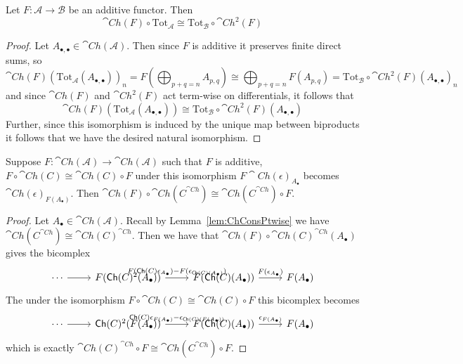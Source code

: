 \begin{lem}[label=lem:totComm]
    Let $F:\mathcal{A}\to \mathcal{B}$ be an additive functor. Then 
    \begin{equation*}
        \cat{Ch}(F)\circ \text{Tot}_\mathcal{A} \cong \text{Tot}_\mathcal{B}\circ \cat{Ch}^2(F)
    \end{equation*}
\end{lem}
\begin{proof}
    Let $A_{\bullet,\bullet} \in \cat{Ch}(\mathcal{A})$. Then since $F$ is additive it preserves finite direct sums, so 
    \begin{equation*}
        \cat{Ch}(F)(\text{Tot}_\mathcal{A}(A_{\bullet,\bullet}))_n = F\left(\bigoplus_{p+q=n}A_{p,q}\right) \cong \bigoplus_{p+q=n}F(A_{p,q}) = \text{Tot}_\mathcal{B}\circ \cat{Ch}^2(F)(A_{\bullet,\bullet})_n
    \end{equation*}
    and since $\cat{Ch}(F)$ and $\cat{Ch}^2(F)$ act term-wise on differentials, it follows that
    \begin{equation*}
        \cat{Ch}(F)(\text{Tot}_\mathcal{A}(A_{\bullet,\bullet})) \cong \text{Tot}_\mathcal{B}\circ \cat{Ch}^2(F)(A_{\bullet,\bullet})
    \end{equation*}
    Further, since this isomorphism is induced by the unique map between biproducts it follows that we have the desired natural isomorphism.
\end{proof}

\begin{lem}[label=commWithComonad]
	Suppose $F:\cat{Ch}(\mathcal{A})\to \cat{Ch}(\mathcal{A})$ such that $F$ is additive, $F\circ \cat{Ch}(C)\cong \cat{Ch}(C)\circ F$ under this isomorphism $F\cat{Ch}(\epsilon)_{A_\bullet}$ becomes $\cat{Ch}(\epsilon)_{F(A_\bullet)}$. Then $\cat{Ch}(F)\circ \cat{Ch}(C^{\cat{Ch}}) \cong \cat{Ch}(C^{\cat{Ch}})\circ F$.
\end{lem}
\begin{proof}
	Let $A_\bullet \in \cat{Ch}(\mathcal{A})$. Recall by Lemma~\ref{lem:ChConsPtwise} we have $\cat{Ch}(C^{\cat{Ch}})\cong \cat{Ch}(C)^{\cat{Ch}}$. Then we have that $\cat{Ch}(F)\circ \cat{Ch}(C)^{\cat{Ch}}(A_\bullet)$ gives the bicomplex 
	\[\begin{tikzcd}
		\cdots & {F(\cat{Ch}(C)^2(A_\bullet))} & {F(\cat{Ch}(C)(A_\bullet))} & {F(A_\bullet)}
		\arrow["{F(\cat{Ch}(C)\epsilon_{A_{\bullet}})-F(\epsilon_{\cat{Ch}(C)(A_\bullet)})}", from=1-2, to=1-3]
		\arrow["{F(\epsilon_{A_\bullet})}", from=1-3, to=1-4]
		\arrow[from=1-1, to=1-2]
	\end{tikzcd}\]
	The under the isomorphism $F\circ \cat{Ch}(C)\cong \cat{Ch}(C)\circ F$ this bicomplex becomes 
	\[\begin{tikzcd}
		\cdots & {\cat{Ch}(C)^2(F(A_\bullet))} & {F(\cat{Ch}(C)(A_\bullet))} & {F(A_\bullet)}
		\arrow["{\cat{Ch}(C)\epsilon_{F(A_{\bullet})}-\epsilon_{\cat{Ch}(C)(F(A_\bullet))}}", from=1-2, to=1-3]
		\arrow["{\epsilon_{F(A_\bullet)}}", from=1-3, to=1-4]
		\arrow[from=1-1, to=1-2]
	\end{tikzcd}\]
	which is exactly $\cat{Ch}(C)^{\cat{Ch}}\circ F \cong \cat{Ch}(C^{\cat{Ch}})\circ F$.
\end{proof}

